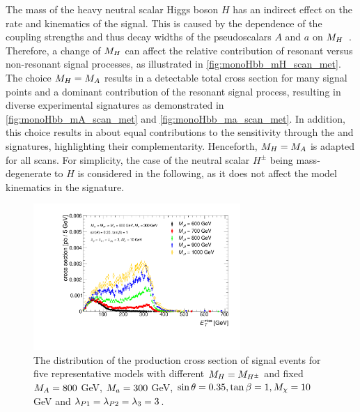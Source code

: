 The mass of the heavy neutral scalar Higgs boson $H$ has an indirect effect on the rate and kinematics of the signal. 
This is caused by the dependence of the coupling strengths and thus decay widths of  the pseudoscalars $A$ and $a$ on  $\mH$~\cite{Bauer:2017ota}. 
Therefore, a change of $\mH$ can affect the relative contribution of resonant versus non-resonant signal processes, as illustrated in \autoref{fig:monoHbb_mH_scan_met}.  
The choice $M_{H} = M_{A}$ results in a detectable total cross section for many signal points and a dominant contribution of the resonant signal process, resulting in diverse experimental signatures as demonstrated in \autoref{fig:monoHbb_mA_scan_met} and \autoref{fig:monoHbb_ma_scan_met}. In addition, this choice results in about equal contributions to the sensitivity through the \monoz and \monoh signatures, highlighting their complementarity. Henceforth,  $M_{H} = M_{A}$ is adapted for all scans. For simplicity, the case of the neutral scalar $H^{\pm}$ being mass-degenerate to $H$ is considered in the following, as it does not affect the \hdma model kinematics in the \monohbb signature.

\begin{figure}[tbp]
\centering
\includegraphics[width=0.7\textwidth]{texinputs/04_grid/figures/monoHbb_mH_scan_MET_liny.pdf}
\caption[$\MET$ distribution in \monohbb events for different $\mH$]
{The \MET distribution of the production cross section of \monohbb signal events for five representative models with different $M_{H} = M_{H^{\pm}}$ 
and fixed $ M_{A}=800$ GeV, $M_{a} = 300 $ GeV,  $ \sin\theta = 0.35, \tan\beta = 1, M_{\chi} = 10$ GeV and $ \lambda_{P1} = \lambda_{P2} = \lambda_{3} = 3 $. 
%
}
\label{fig:monoHbb_mH_scan_met}
\end{figure}



